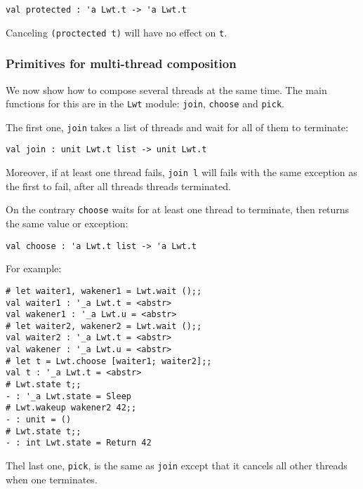 \lstset{language=[Objective]Caml}\begin{lstlisting}
val protected : 'a Lwt.t -> 'a Lwt.t

\end{lstlisting}
Canceling {\tt (proctected t)} will have no effect on {\tt t}.



\subsubsection{ Primitives for multi-thread composition }

We now show how to compose several threads at the same time. The
main functions for this are in the {\tt Lwt} module: {\tt join},
{\tt choose} and {\tt pick}.



The first one, {\tt join} takes a list of threads and wait for all
of them to terminate:



\lstset{language=[Objective]Caml}\begin{lstlisting}
val join : unit Lwt.t list -> unit Lwt.t

\end{lstlisting}
Moreover, if at least one thread fails, {\tt join l} will fails with
the same exception as the first to fail, after all threads threads terminated.



On the contrary {\tt choose} waits for at least one thread to
terminate, then returns the same value or exception:



\lstset{language=[Objective]Caml}\begin{lstlisting}
val choose : 'a Lwt.t list -> 'a Lwt.t

\end{lstlisting}
For example:



\lstset{language=[Objective]Caml}\begin{lstlisting}
# let waiter1, wakener1 = Lwt.wait ();;
val waiter1 : '_a Lwt.t = <abstr>
val wakener1 : '_a Lwt.u = <abstr>
# let waiter2, wakener2 = Lwt.wait ();;
val waiter2 : '_a Lwt.t = <abstr>
val wakener : '_a Lwt.u = <abstr>
# let t = Lwt.choose [waiter1; waiter2];;
val t : '_a Lwt.t = <abstr>
# Lwt.state t;;
- : '_a Lwt.state = Sleep
# Lwt.wakeup wakener2 42;;
- : unit = ()
# Lwt.state t;;
- : int Lwt.state = Return 42

\end{lstlisting}
Thel last one, {\tt pick}, is the same as {\tt join} except that it cancels
all other threads when one terminates.



